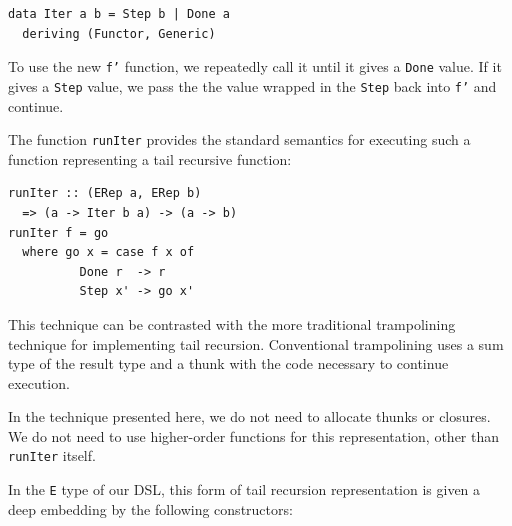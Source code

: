 \documentclass[runningheads, a4paper]{llncs}
\newcommand{\ttt}{\texttt}
\newenvironment{todo}
  {\ifthenelse{\isundefined{\showtodos}}{\comment}{\begin{tcolorbox}
    \textbf{TODO}:}}
  {\ifthenelse{\isundefined{\showtodos}}{\endcomment}{\end{tcolorbox}}
  }
\begin{document}
\begin{lstlisting}
data Iter a b = Step b | Done a
  deriving (Functor, Generic)
\end{lstlisting}

To use the new \ttt{f'} function, we repeatedly call it until it gives a
\ttt{Done} value. If it gives a \ttt{Step} value, we pass the the value wrapped
in the \ttt{Step} back into \ttt{f'} and continue.

The function \ttt{runIter} provides the standard semantics for executing such a
function representing a tail recursive function:

\begin{lstlisting}
runIter :: (ERep a, ERep b)
  => (a -> Iter b a) -> (a -> b)
runIter f = go
  where go x = case f x of
          Done r  -> r
          Step x' -> go x'
\end{lstlisting}








This technique can be contrasted with the more traditional trampolining
technique for implementing tail recursion. Conventional trampolining uses a
sum type of the result type and a thunk with the code necessary to continue
execution.~\cite{Ganz:99:Trampolined}

In the technique presented here, we do not need to allocate thunks or closures.
We do not need to use higher-order functions for this representation, other than \ttt{runIter} itself.

In the \ttt{E} type of our DSL, this form of tail recursion representation is
given a deep embedding by the following constructors:
\end{document}
